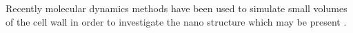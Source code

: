 Recently molecular dynamics methods have been used to simulate small volumes of
the cell wall in order to investigate the nano structure which may be present \cite{Charlier_2012}\cite{Zhang_2009}\cite{Sangha_2011}.